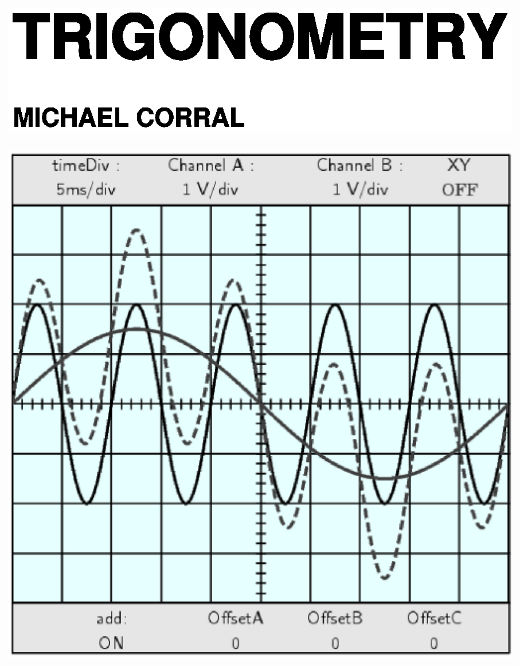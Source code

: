 \documentclass[paper=letter,fontsize=11pt,titlepage,openany,twoside,
numbers=noenddot,index=totoc]{scrbook}
\theoremstyle{definition}
\theoremstyle{itexmp}
\numberwithin{figure}{section}
\begin{document}
\frontmatter
\pagestyle{empty}
\thisfancypage{\setlength{\fboxsep}{1pt}\setlength\fboxrule{1.5pt}\fbox}{}

\includegraphics{cover-top}\vspace{14mm}

\includegraphics{osci-large-color}
\end{document}
